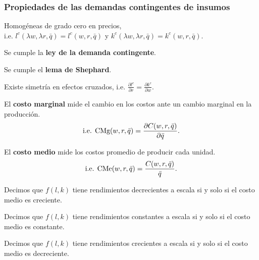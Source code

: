 \documentclass[8pt,a4paper]{extarticle}
\begin{document}
\begin{multicols}{3}
\subsubsection{Propiedades de las demandas contingentes de insumos}

\begin{eqlist}
\item Homogéneas de grado cero en precios, \\ i.e. $l^c (\lambda w, \lambda r, \bar{q}) = l^c (w, r, \bar{q})$ y $k^c (\lambda w, \lambda r, \bar{q}) = k^c (w, r, \bar{q})$.
\item Se cumple la \textbf{ley de la demanda contingente}.
\item Se cumple el \textbf{lema de Shephard}.
\item Existe simetría en efectos cruzados, i.e. $\displaystyle \frac{\partial l^c}{\partial r} = \frac{\partial k^c}{\partial w}$.
\end{eqlist}

\begin{boxdef}
	El \textbf{costo marginal} mide el cambio en los costos ante un cambio marginal en la producción.
	\[
		\text{\normalfont i.e. CMg} (w, r, \bar{q}) = \frac{\partial C (w, r, \bar{q})}{\partial \bar{q}}
	.\] 
\end{boxdef}

\begin{boxdef}
	El \textbf{costo medio} mide los costos promedio de producir cada unidad.
	\[
		\text{\normalfont i.e. CMe} (w, r, \bar{q}) = \frac{C(w, r, \bar{q})}{\bar{q}}
	.\] 
\end{boxdef}

\sectionbreak

\begin{boxprop}
	Decimos que $f(l, k)$ tiene rendimientos decrecientes a escala si y solo si el costo medio es creciente.
\end{boxprop}

\begin{boxprop}                                                                                                                                  
    Decimos que $f(l, k)$ tiene rendimientos constantes a escala si y solo si el costo medio es constante.        
\end{boxprop}

\begin{boxprop}                                                                                                                                  
    Decimos que $f(l, k)$ tiene rendimientos crecientes a escala si y solo si el costo medio es decreciente.        
\end{boxprop}


\end{multicols}
\end{document}
